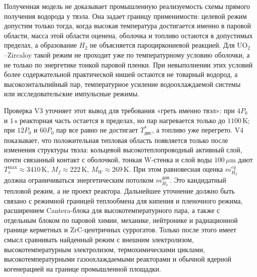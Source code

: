 \documentclass[12pt]{article}
\begin{document}
Полученная модель не доказывает промышленную реализуемость схемы прямого получения водорода у твэла. Она задает границу применимости: целевой режим допустим только тогда, когда высокая температура достигается именно в паровой области, масса этой области оценена, оболочка и топливо остаются в допустимых пределах, а образование \(H_2\) не объясняется пароциркониевой реакцией. Для \(\mathrm{UO_2}\)--Zircaloy такой режим не проходит уже по температурному условию оболочки, а не только по энергетике тонкой паровой пленки. При невыполнении этих условий более содержательной практической нишей остаются не товарный водород, а высокоэнтальпийный пар, температурное усиление водоохлаждаемой системы или исследовательские импульсные режимы.

Проверка V3 уточняет этот вывод для требования «греть именно твэл»: при \(4P_0\) и \(1\,\mathrm{s}\) реакторная часть остается в пределах, но пар нагревается только до \(1100\,\mathrm{K}\); при \(12P_0\) и \(60P_0\) пар все равно не достигает \(T^*_{\mathrm{дис}}\), а топливо уже перегрето. V4 показывает, что положительная тепловая область появляется только после изменения структуры твэла: кольцевой высокотеплопроводный активный слой, почти связанный контакт с оболочкой, тонкая W-стенка и слой воды \(100\,\mu\mathrm{m}\) дают \(T_s^{\max}\approx3410\,\mathrm{K}\), \(M_f\approx222\,\mathrm{K}\), \(M_W\approx269\,\mathrm{K}\). При этом равновесная оценка \(m_{H_2}^{eq}\) должна ограничиваться энергетическим потолком \(m_{H_2}^{\mathrm{доп}}\). Это кандидатный тепловой режим, а не проект реактора. Дальнейшее уточнение должно быть связано с режимной границей теплообмена для кипения и пленочного режима, расширением Cantera-блока для высокотемпературного пара, а также с отдельным блоком по паровой химии, механике, нейтронике и радиационной границе керметных и ZrC-центричных суррогатов. Только после этого имеет смысл сравнивать найденный режим с внешним электролизом, высокотемпературным электролизом, термохимическими циклами, высокотемпературными газоохлаждаемыми реакторами и обычной ядерной когенерацией на границе промышленной площадки.

\newpage
\end{document}
